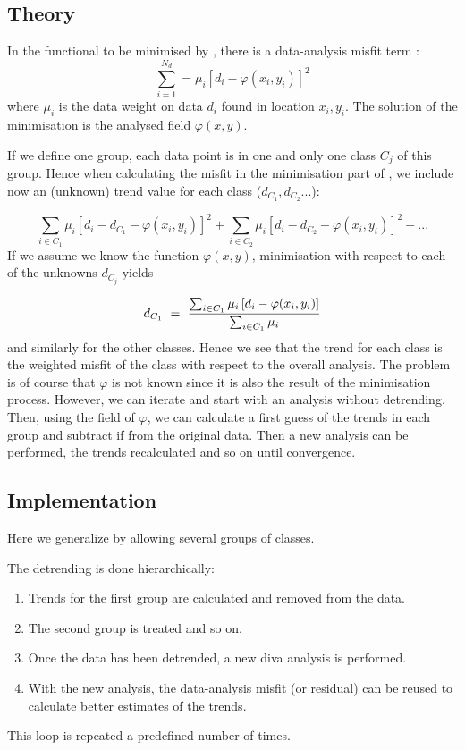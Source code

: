 \subsection{Theory}

In the functional to be minimised by \diva, there is a data-analysis misfit term :
\begin{equation}
\sum_{i=1}^{N_{d}} =  \mu_i \left[ d_i - \varphi(x_i,y_i) \right]^2
\end{equation}
where $\mu_i$ is the data weight on data $d_i$ found in location $x_i,y_i$. The solution of the minimisation is the analysed field $\varphi(x,y)$.


If we define one group, each data point is in one and only one class $C_j$ of this group. Hence
when calculating the misfit in the minimisation part of \diva , we include now an (unknown) trend value for each class ($d_{C_1}, d_{C_2} ...$):

\begin{equation}
\sum_{i\in C_1} \mu_i \left[ d_i -d_{C_1}- \varphi(x_i,y_i) \right]^2 + \sum_{i\in C_2} \mu_i \left[ d_i -d_{C_2}- \varphi(x_i,y_i) \right]^2 + ...
\end{equation}
If we assume we know the function $\varphi(x,y)$, minimisation with respect to each of the unknowns $d_{C_j}$ yields


\begin{equation}
d_{C_1} ~=~{ \sum_{i\in C_1} \mu_i \left[ d_i - \varphi(x_i,y_i) \right] \over \sum_{i\in C_1} \mu_i }
\end{equation}
and similarly for the other classes. Hence we see that the trend for each class is the weighted misfit of the class with respect to the overall analysis.
The problem is of course that $\varphi$ is not known since it is also the result of the minimisation process. However, we can iterate and start with an analysis without detrending. Then, using the field of $\varphi$, we can calculate a first guess of the trends in each group and subtract if from the original data. 
Then a new analysis can be performed, the trends recalculated and so on until convergence.


\subsection{Implementation}

Here we generalize by allowing several groups of classes.

The detrending is done hierarchically:
\begin{enumerate}
\item Trends for the first group are calculated and removed from the data. 
\item The second group is treated and so on.
\item Once the data has been detrended, a new diva analysis is performed. 
\item With the new analysis, the data-analysis misfit (or residual) can be reused to
calculate better estimates of the trends. 
\end{enumerate}
This loop is repeated a predefined number of times. 


